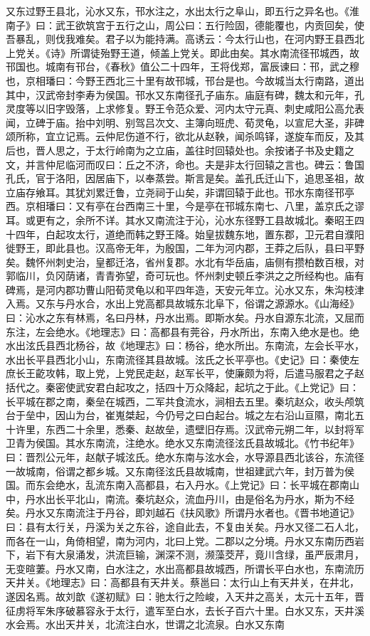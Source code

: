 \documentclass[12pt,UTF8]{ctexbook}
\begin{document}
又东过野王县北，沁水又东，邗水注之，水出太行之阜山，即五行之异名也。《淮南子》曰：武王欲筑宫于五行之山，周公曰：五行险固，德能覆也，内贡回矣，使吾暴乱，则伐我难矣。君子以为能持满。高诱云：今太行山也，在河内野王县西北上党关。《诗》所谓徒殆野王道，倾盖上党关。即此由矣。其水南流径邗城西，故邗国也。城南有邗台，《春秋》值公二十四年，王将伐郑，富辰谏曰：邗，武之穆也，京相璠曰：今野王西北三十里有故邗城，邗台是也。今故城当太行南路，道出其中，汉武帝封李寿为侯国。邗水又东南径孔子庙东。庙庭有碑，魏太和元年，孔灵度等以旧字毁落，上求修复。野王令范众爱、河内太守元真、刺史咸阳公高允表闻，立碑于庙。抬中刘明、别驾吕次文、主簿向班虎、荀灵龟，以宣尼大圣，非碑颂所称，宜立记焉。云仲尼伤道不行，欲北从赵鞅，闻杀鸣铎，遂旋车而反，及其后也，晋人思之，于太行岭南为之立庙，盖往时回辕处也。余按诸子书及史籍之文，并言仲尼临河而叹曰：丘之不济，命也。夫是非太行回辕之言也。碑云：鲁国孔氏，官于洛阳，因居庙下，以奉蒸尝。斯言是矣。盖孔氏迁山下，追思圣祖，故立庙存飨耳。其犹刘累迁鲁，立尧祠于山矣，非谓回辕于此也。邗水东南径邗亭西。京相璠曰：又有亭在台西南三十里，今是亭在邗城东南七、八里，盖京氏之谬耳。或更有之，余所不详。其水又南流注于沁，沁水东径野工县故城北。秦昭王四十四年，白起攻太行，道绝而韩之野王降。始皇拔魏东地，置东郡，卫元君自濮阳徙野王，即此县也。汉高帝无年，为殷国，二年为河内郡，王莽之后队，县曰平野矣。魏怀州刺史治，皇都迁洛，省州复郡。水北有华岳庙，庙侧有攒柏数百根，对郭临川，负冈荫诸，青青弥望，奇可玩也。怀州刺史顿丘李洪之之所经构也。庙有碑焉，是河内郡功曹山阳荀灵龟以和平四年造，天安元年立。沁水又东，朱沟枝津入焉。又东与丹水合，水出上党高都具故城东北阜下，俗谓之源源水。《山海经》曰：沁水之东有林焉，名曰丹林，丹水出焉。即斯水矣。丹水自源东北流，又屈而东注，左会绝水。《地理志》曰：高都县有莞谷，丹水所出，东南入绝水是也。绝水出泫氏县西北杨谷，故《地理志》曰：杨谷，绝水所出。东南流，左会长平水，水出长平县西北小山，东南流径其县故城。泫氏之长平亭也。《史记》曰：秦使左庶长王齕攻韩，取上党，上党民走赵，赵军长平，使廉颇为将，后遣马服君之子赵括代之。秦密使武安君白起攻之，括四十万众降起，起坑之于此。《上党记》曰：长平城在郡之南，秦垒在城西，二军共食流水，涧相去五里。秦坑赵众，收头颅筑台于垒中，因山为台，崔嵬桀起，今仍号之曰白起台。城之左右沿山亘隰，南北五十许里，东西二十余里，悉秦、赵故垒，遗壁旧存焉。汉武帝元朔二年，以封将军卫青为侯国。其水东南流，注绝水。绝水又东南流径泫氏县故城北。《竹书纪年》曰：晋烈公元年，赵献子城泫氏。绝水东南与泫水会，水导源县西北该谷，东流径一故城南，俗谓之都乡城。又东南径泫氏县故城南，世祖建武六年，封万普为侯国。而东会绝水，乱流东南入高都县，右入丹水。《上党记》曰：长平城在郡南山中，丹水出长平北山，南流。秦坑赵众，流血丹川，由是俗名为丹水，斯为不经矣。丹水又东南流注于丹谷，即刘越石《扶风歌》所谓丹水者也。《晋书地道记》曰：县有太行关，丹溪为关之东谷，途自此去，不复由关矣。丹水又径二石人北，而各在一山，角倚相望，南为河内，北曰上党。二郡以之分境。丹水又东南历西岩下，岩下有大泉涌发，洪流巨输，渊深不测，濒藻茭芹，竟川含绿，虽严辰肃月，无变暄萋。丹水又南，白水注之，水出高都县故城西，所谓长平白水也，东南流历天井关。《地理志》曰：高都县有天井关。蔡邕曰：太行山上有天井关，在井北，遂因名焉。故刘歆《遂初赋》曰：驰太行之险峻，入天井之高关，太元十五年，晋征虏将军朱序破慕容永于太行，遣军至白水，去长子百六十里。白水又东，天井溪水会焉。水出天井关，北流注白水，世谓之北流泉。白水又东南
\end{document}
